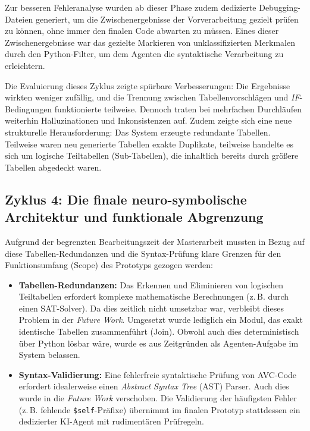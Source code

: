 Zur besseren Fehleranalyse wurden ab dieser Phase zudem dedizierte Debugging-Dateien generiert, um die Zwischenergebnisse der Vorverarbeitung gezielt prüfen zu können, ohne immer den finalen Code abwarten zu müssen. Eines dieser Zwischenergebnisse war das gezielte Markieren von unklassifizierten Merkmalen durch den Python-Filter, um dem Agenten die syntaktische Verarbeitung zu erleichtern.

Die Evaluierung dieses Zyklus zeigte spürbare Verbesserungen: Die Ergebnisse wirkten weniger zufällig, und die Trennung zwischen Tabellenvorschlägen und \textit{IF}-Bedingungen funktionierte teilweise. Dennoch traten bei mehrfachen Durchläufen weiterhin Halluzinationen und Inkonsistenzen auf. Zudem zeigte sich eine neue strukturelle Herausforderung: Das System erzeugte redundante Tabellen. Teilweise waren neu generierte Tabellen exakte Duplikate, teilweise handelte es sich um logische Teiltabellen (Sub-Tabellen), die inhaltlich bereits durch größere Tabellen abgedeckt waren.

\subsection{Zyklus 4: Die finale neuro-symbolische Architektur und funktionale Abgrenzung}
\label{subsec:zyklus_4_neuro_symbolisch}

Aufgrund der begrenzten Bearbeitungszeit der Masterarbeit mussten in Bezug auf diese Tabellen-Redundanzen und die Syntax-Prüfung klare Grenzen für den Funktionsumfang (Scope) des Prototyps gezogen werden:

\begin{itemize}
    \item \textbf{Tabellen-Redundanzen:} Das Erkennen und Eliminieren von logischen Teiltabellen erfordert komplexe mathematische Berechnungen (z.\,B. durch einen SAT-Solver). Da dies zeitlich nicht umsetzbar war, verbleibt dieses Problem in der \textit{Future Work}. Umgesetzt wurde lediglich ein Modul, das exakt identische Tabellen zusammenführt (Join). Obwohl auch dies deterministisch über Python lösbar wäre, wurde es aus Zeitgründen als Agenten-Aufgabe im System belassen.
    \item \textbf{Syntax-Validierung:} Eine fehlerfreie syntaktische Prüfung von \ac{AVC}-Code erfordert idealerweise einen \textit{Abstract Syntax Tree} (AST) Parser. Auch dies wurde in die \textit{Future Work} verschoben. Die Validierung der häufigsten Fehler (z.\,B. fehlende \texttt{\$self}-Präfixe) übernimmt im finalen Prototyp stattdessen ein dedizierter \ac{KI}-Agent mit rudimentären Prüfregeln.
\end{itemize}

